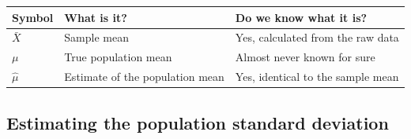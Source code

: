 \documentclass[
]{book}
\begin{document}
\begin{longtable}[]{@{}lll@{}}
\toprule
\begin{minipage}[b]{0.30\columnwidth}\raggedright
Symbol\strut
\end{minipage} & \begin{minipage}[b]{0.30\columnwidth}\raggedright
What is it?\strut
\end{minipage} & \begin{minipage}[b]{0.30\columnwidth}\raggedright
Do we know what it is?\strut
\end{minipage}\tabularnewline
\midrule
\endhead
\begin{minipage}[t]{0.30\columnwidth}\raggedright
\(\bar{X}\)\strut
\end{minipage} & \begin{minipage}[t]{0.30\columnwidth}\raggedright
Sample mean\strut
\end{minipage} & \begin{minipage}[t]{0.30\columnwidth}\raggedright
Yes, calculated from the raw data\strut
\end{minipage}\tabularnewline
\begin{minipage}[t]{0.30\columnwidth}\raggedright
\(\mu\)\strut
\end{minipage} & \begin{minipage}[t]{0.30\columnwidth}\raggedright
True population mean\strut
\end{minipage} & \begin{minipage}[t]{0.30\columnwidth}\raggedright
Almost never known for sure\strut
\end{minipage}\tabularnewline
\begin{minipage}[t]{0.30\columnwidth}\raggedright
\(\hat{\mu}\)\strut
\end{minipage} & \begin{minipage}[t]{0.30\columnwidth}\raggedright
Estimate of the population mean\strut
\end{minipage} & \begin{minipage}[t]{0.30\columnwidth}\raggedright
Yes, identical to the sample mean\strut
\end{minipage}\tabularnewline
\bottomrule
\end{longtable}

\hypertarget{estimating-the-population-standard-deviation}{%
\subsection{Estimating the population standard deviation}\label{estimating-the-population-standard-deviation}}
\end{document}
